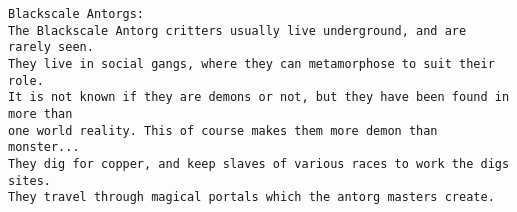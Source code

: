 \clearpage

\goodbreak \begin{samepage} \small \begin{verbatim}
Blackscale Antorgs:
The Blackscale Antorg critters usually live underground, and are rarely seen.
They live in social gangs, where they can metamorphose to suit their role.
It is not known if they are demons or not, but they have been found in more than
one world reality. This of course makes them more demon than monster...
They dig for copper, and keep slaves of various races to work the digs sites.
They travel through magical portals which the antorg masters create.
\end{verbatim} \normalsize \end{samepage}

\

